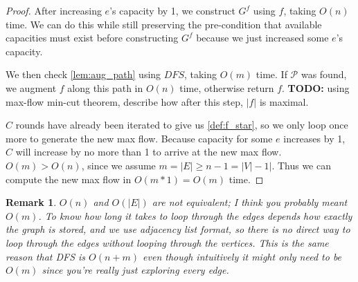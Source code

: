 \documentclass{article}
\newtheorem{remark}[theorem]{Remark}
\begin{document}
\begin{proof}
	After increasing $e$'s capacity by 1, we construct $G^{f}$ using $f$, taking $O(n)$ time. We can do this while still preserving the pre-condition that available capacities must exist before constructing $G^{f}$ because we just increased some $e$'s capacity.
	
	We then check \ref{lem:aug_path} using $DFS$, taking $O(m)$ time. If $\mathcal{P}$ was found, we augment $f$ along this path in $O(n)$ time, otherwise return $f$. \textbf{TODO:} using max-flow min-cut theorem, describe how after this step, $|f|$ is maximal.
	
	$C$ rounds have already been iterated to give us \ref{def:f_star}, so we only loop once more to generate the new max flow. Because capacity for some $e$ increases by 1, $C$ will increase by no more than 1 to arrive at the new max flow. $O(m) >O(n)$, since we assume $m = |E| \geq n-1 = |V|-1|$. Thus we can compute the new max flow in $O(m*1) = O(m)$ time.
\end{proof}

\begin{remark}
	$O(n)$ and $O(|E|)$ are not equivalent; I think you probably meant $O(m)$. To know how long it takes to loop through the edges depends how exactly the graph is stored, and we use adjacency list format, so there is no direct way to loop through the edges without looping through the vertices. This is the same reason that DFS is $O(n+m)$ even though intuitively it might only need to be $O(m)$ since you're really just exploring every edge. 
\end{remark}
 
\end{document}
